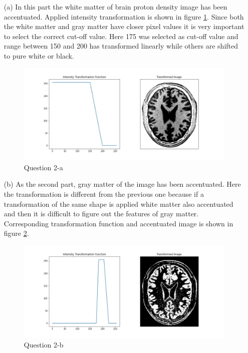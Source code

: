 \documentclass[11pt]{article}
\begin{document}
\begin{itemize}
    \item[(a)] In this part the white matter of brain proton density image has been accentuated. Applied intensity transformation is
               shown in figure \ref{Question 2-a}. Since both the white matter and gray matter have closer pixel values it is very important 
               to select the correct cut-off value. Here 175 was selected as cut-off value and range between 150 and 200 has transformed 
               linearly while others are shifted to pure white or black.

                \begin{figure}[!h]
                    \centering
                    \includegraphics[width=\textwidth]{Images/2a.jpg}
                    \caption{Question 2-a}
                    \label{Question 2-a}
                \end{figure} 
    
    \item[(b)]  As the second part, gray matter of the image has been accentuated. Here the transformation is different from the previous one because
                if a transformation of the same shape is applied white matter also accentuated and then it is difficult to figure out the features of 
                gray matter. Corresponding transformation function and accentuated image is shown in figure \ref{Question 2-b}.

                \begin{figure}[!h]
                    \centering
                    \includegraphics[width=\textwidth]{Images/2b.jpg}
                    \caption{Question 2-b}
                    \label{Question 2-b}
                \end{figure} 
\end{itemize}
\end{document}
